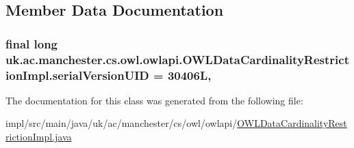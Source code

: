 \subsection{Member Data Documentation}
\hypertarget{classuk_1_1ac_1_1manchester_1_1cs_1_1owl_1_1owlapi_1_1_o_w_l_data_cardinality_restriction_impl_aad0d0d7a2dd18d89c842913cf0d6e4e6}{
\subsubsection[{serial\-Version\-U\-I\-D}]{\setlength{\rightskip}{0pt plus 5cm}final long uk.\-ac.\-manchester.\-cs.\-owl.\-owlapi.\-O\-W\-L\-Data\-Cardinality\-Restriction\-Impl.\-serial\-Version\-U\-I\-D = 30406\-L\hspace{0.3cm}{\ttfamily [static]}, {\ttfamily [private]}}}\label{classuk_1_1ac_1_1manchester_1_1cs_1_1owl_1_1owlapi_1_1_o_w_l_data_cardinality_restriction_impl_aad0d0d7a2dd18d89c842913cf0d6e4e6}


The documentation for this class was generated from the following file\-:\begin{DoxyCompactItemize}
\item 
impl/src/main/java/uk/ac/manchester/cs/owl/owlapi/\hyperlink{_o_w_l_data_cardinality_restriction_impl_8java}{O\-W\-L\-Data\-Cardinality\-Restriction\-Impl.\-java}\end{DoxyCompactItemize}
